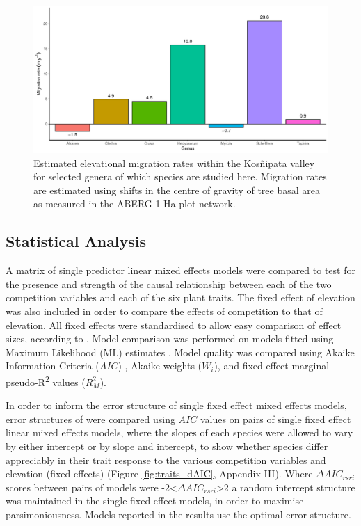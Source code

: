 \documentclass[a4paper, 11pt]{article}
\begin{document}
\begin{figure}[H]
\includegraphics[width=\textwidth]{mig}
\centering
\caption{Estimated elevational migration rates within the Kos\~{n}ipata valley for selected genera of which species are studied here. Migration rates are estimated using shifts in the centre of gravity of tree basal area as measured in the ABERG 1 Ha plot network.}
\label{fig:comp_radius_fit}
\end{figure}

\subsection{Statistical Analysis}

A matrix of single predictor linear mixed effects models were compared to test for the presence and strength of the causal relationship between each of the two competition variables and each of the six plant traits. The fixed effect of elevation was also included in order to compare the effects of competition to that of elevation. All fixed effects were standardised to allow easy comparison of effect sizes, according to \citep{Gelman2008, Grueber2011, Gelman2018}. Model comparison was performed on models fitted using Maximum Likelihood (ML) estimates \citep{Bolker_weevils}. Model quality was compared using Akaike Information Criteria ($AIC$) \citep{Akaike1992}, Akaike weights ($W_i$), and fixed effect marginal pseudo-R\textsuperscript{2} values ($R_M^2$). 

In order to inform the error structure of single fixed effect mixed effects models, error structures of were compared using $AIC$ values on pairs of single fixed effect linear mixed effects models, where the slopes of each species were allowed to vary by either intercept or by slope and intercept, to show whether species differ appreciably in their trait response to the various competition variables and elevation (fixed effects) (Figure \ref{fig:traits_dAIC}, Appendix III). Where $\Delta{}AIC_{rsri}$ scores between pairs of models were -2\textless{}$\Delta{}AIC_{rsri}$\textgreater{}2 a random intercept structure was maintained in the single fixed effect models, in order to maximise parsimoniousness. Models reported in the results use the optimal error structure.
\end{document}
